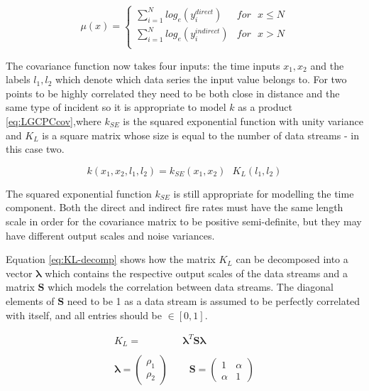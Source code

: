 \documentclass[a4paper,11pt]{report}
\begin{document}
\begin{equation} \label{eq:LGCPCmean}
\mu (x) = \begin{cases}  
\displaystyle \sum_{i=1}^{N} log_e(y_i^{direct}) & for \text{ }x\le N \\
\displaystyle \sum_{i=1}^{N}log_e(y_i^{indirect}) & for \text{ }x>N \\ \end{cases}
\end{equation}

The covariance function now takes four inputs: the time inputs \(x_1, x_2\) and the labels \(l_1,l_2\) which denote which data series the input value belongs to. For two points to be highly correlated they need to be both close in distance and the same type of incident so it is appropriate to model \(k\) as a product \ref{eq:LGCPCcov},where \(k_{SE}\) is the squared exponential function with unity variance and \(K_L\) is a square matrix whose size is equal to the number of data streams - in this case two. 

\begin{equation} \label{eq:LGCPCcov}
k(x_1,x_2,l_1,l_2) = k_{SE}(x_1,x_2) \text{ } K_L(l_1,l_2) 
\end{equation}

The squared exponential function \(k_{SE}\) is still appropriate for modelling the time component. Both the direct and indirect fire rates must have the same length scale in order for the covariance matrix to be positive semi-definite, but they may have different output scales and noise variances.

Equation \ref{eq:KL-decomp} shows how the matrix \(K_L\) can be decomposed into a vector \(\boldsymbol{\lambda}\) which contains the respective output scales of the data streams and a matrix \(\mathbf{S}\) which models the correlation between data streams. The diagonal elements of \(\mathbf{S}\) need to be 1 as a data stream is assumed to be perfectly correlated with itself, and all entries should be \(\in [0,1]\).

\singlespacing
\begin{equation} \label{eq:KL-decomp}
\begin{aligned}
K_L =& \boldsymbol{\lambda}^T \mathbf{S} \boldsymbol{\lambda} \\ \\
\boldsymbol{\lambda} = \left( \begin{array}{cc}
\rho_1  \\
\rho_2 \end{array} \right)\text{ } & \text{ }
\mathbf{S} = \left( \begin{array}{cc}
1 & \alpha  \\
\alpha  & 1 \end{array} \right)
\end{aligned}
\end{equation}
\doublespacing
\end{document}

